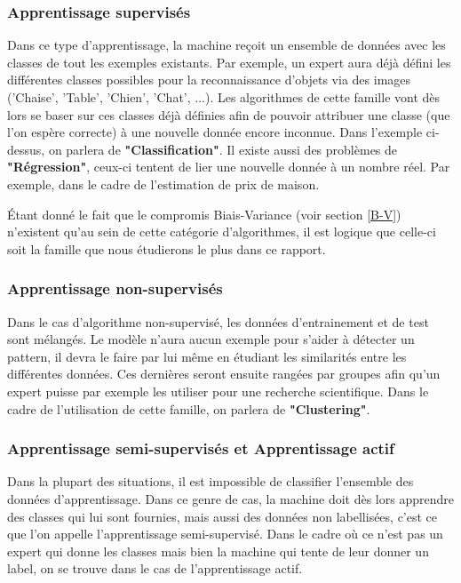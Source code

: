 \documentclass[a4paper]{article}
\begin{document}
\subsubsection{Apprentissage supervisés}
Dans ce type d'apprentissage, la machine reçoit un ensemble de données avec les classes de tout les exemples existants.
Par exemple, un expert aura déjà défini les différentes classes possibles pour la reconnaissance d'objets via des images ('Chaise', 'Table', 'Chien', 'Chat', ...). Les algorithmes de cette famille vont dès lors se baser sur ces classes déjà définies afin de pouvoir attribuer une classe (que l'on espère correcte) à une nouvelle donnée encore inconnue. Dans l'exemple ci-dessus, on parlera de \textbf{"Classification"}. \newline
Il existe aussi des problèmes de \textbf{"Régression"}, ceux-ci tentent de lier une nouvelle donnée à un nombre réel. Par exemple, dans le cadre de l'estimation de prix de maison. \newline

Étant donné le fait que le compromis Biais-Variance (voir section \ref{B-V}) n'existent qu'au sein de cette catégorie d'algorithmes, il est logique que celle-ci soit la famille que nous étudierons le plus dans ce rapport.

\subsubsection{Apprentissage non-supervisés}
Dans le cas d'algorithme non-supervisé, les données d'entrainement et de test sont mélangés. Le modèle n'aura aucun exemple pour s'aider à détecter un pattern, il devra le faire par lui même en étudiant les similarités entre les différentes données. Ces dernières seront ensuite rangées par groupes afin qu'un expert puisse par exemple les utiliser pour une recherche scientifique. Dans le cadre de l'utilisation de cette famille, on parlera de \textbf{"Clustering"}. \newline

\subsubsection{Apprentissage semi-supervisés et Apprentissage actif}
Dans la plupart des situations, il est impossible de classifier l'ensemble des données d'apprentissage. Dans ce genre de cas, la machine doit dès lors apprendre des classes qui lui sont fournies, mais aussi des données non labellisées, c'est ce que l'on appelle l'apprentissage semi-supervisé. Dans le cadre où ce n'est pas un expert qui donne les classes mais bien la machine qui tente de leur donner un label, on se trouve dans le cas de l'apprentissage actif. 
\end{document}
